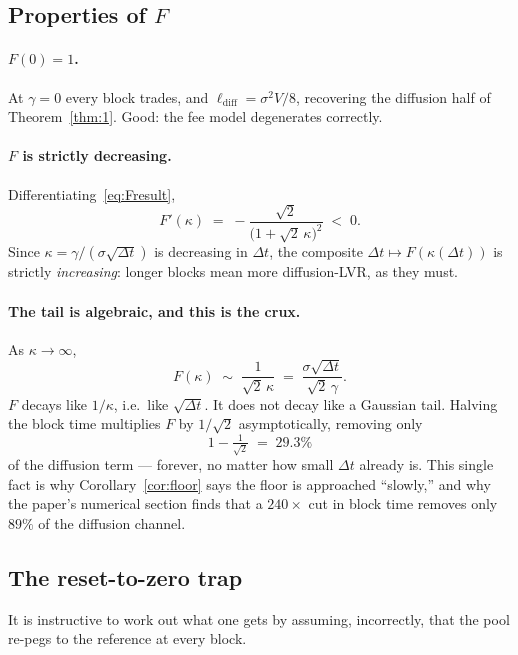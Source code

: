 \documentclass[11pt]{article}
\theoremstyle{definition}
\theoremstyle{remark}
\newcommand{\dt}{\Delta t}
\newcommand{\1}{\mathbf{1}}
\begin{document}
\subsection{Properties of \texorpdfstring{$F$}{F}}

\paragraph{$F(0) = 1$.} At $\gamma = 0$ every block trades, and $\ell_{\mathrm{diff}} = \sigma^2 V/8$, recovering the diffusion half of Theorem~\ref{thm:1}. Good: the fee model degenerates correctly.

\paragraph{$F$ is strictly decreasing.} Differentiating~\eqref{eq:Fresult},
\begin{equation}\label{eq:Fprime}
F'(\kappa) \;=\; -\frac{\sqrt2}{\big(1+\sqrt2\,\kappa\big)^{2}} \;<\; 0 .
\end{equation}
Since $\kappa = \gamma/(\sigma\sqrt{\dt})$ is decreasing in $\dt$, the composite $\dt \mapsto F(\kappa(\dt))$ is strictly \emph{increasing}: longer blocks mean more diffusion-LVR, as they must.

\paragraph{The tail is algebraic, and this is the crux.} As $\kappa \to \infty$,
\[
F(\kappa) \;\sim\; \frac{1}{\sqrt2\,\kappa} \;=\; \frac{\sigma\sqrt{\dt}}{\sqrt2\,\gamma}.
\]
$F$ decays like $1/\kappa$, i.e.\ like $\sqrt{\dt}$. It does not decay like a Gaussian tail. Halving the block time multiplies $F$ by $1/\sqrt2$ asymptotically, removing only
\[
1 - \tfrac{1}{\sqrt2} \;=\; 29.3\%
\]
of the diffusion term --- forever, no matter how small $\dt$ already is. This single fact is why Corollary~\ref{cor:floor} says the floor is approached ``slowly,'' and why the paper's numerical section finds that a $240\times$ cut in block time removes only $89\%$ of the diffusion channel.

\subsection{The reset-to-zero trap}\label{sec:resettrap}

It is instructive to work out what one gets by assuming, incorrectly, that the pool re-pegs to the reference at every block.
\end{document}

